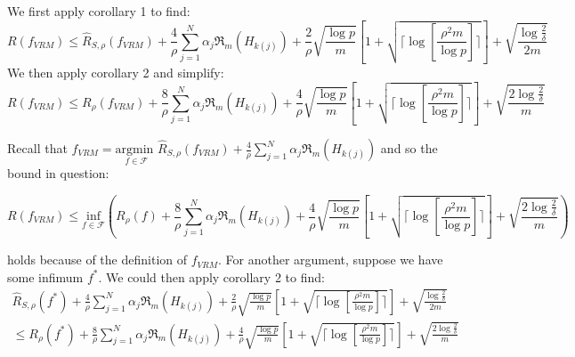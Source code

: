 \documentclass[]{article}
\title{}
\author{}
\begin{document}
\maketitle

\section{}

We first apply corollary 1 to find:
\begin{equation}
	R(f_{VRM}) \le \hat{R}_{S,\rho}\left(f_{VRM}\right) + \frac{4}{\rho} \sum_{j=1}^{N} \alpha_j \mathfrak{R}_m \left( H_{k \left( j \right)} \right) + \frac{2}{\rho} \sqrt{\frac{\log p}{m}} \left[1+\sqrt{\lceil \log \left[ \frac{\rho^2 m}{\log p} \right]\rceil}\right] + \sqrt{\frac{\log \frac{2}{\delta}}{2m}}
\end{equation}
We then apply corollary 2 and simplify:
\begin{equation}
	R(f_{VRM}) \le R_\rho\left(f_{VRM}\right) + \frac{8}{\rho} \sum_{j=1}^{N} \alpha_j \mathfrak{R}_m \left( H_{k \left( j \right)} \right) + \frac{4}{\rho} \sqrt{\frac{\log p}{m}} \left[1+\sqrt{\lceil \log \left[ \frac{\rho^2 m}{\log p} \right]\rceil}\right] + \sqrt{\frac{2\log \frac{2}{\delta}}{m}}
\end{equation}

\noindent Recall that $f_{VRM} = \underset{f \in \mathcal{F}}{\text{argmin }} \hat{R}_{S,\rho}\left(f_{VRM}\right) + \frac{4}{\rho} \sum_{j=1}^{N} \alpha_j \mathfrak{R}_m \left( H_{k \left( j \right)} \right)$ and so the bound in question:

\begin{equation}
	R(f_{VRM}) \le \underset{f \in \mathcal{F}}{\text{inf}}\left(R_\rho\left(f\right) + \frac{8}{\rho} \sum_{j=1}^{N} \alpha_j \mathfrak{R}_m \left( H_{k \left( j \right)} \right) + \frac{4}{\rho} \sqrt{\frac{\log p}{m}} \left[1+\sqrt{\lceil \log \left[ \frac{\rho^2 m}{\log p} \right]\rceil}\right] + \sqrt{\frac{2\log \frac{2}{\delta}}{m}}\right)
\end{equation}

\noindent holds because of the definition of $f_{VRM}$. For another argument, suppose we have some infimum $f^*$. We could then apply corollary 2 to find:
\begin{equation}
\begin{split}
	\hat{R}_{S,\rho}\left(f^*\right) + \frac{4}{\rho} \sum_{j=1}^{N} \alpha_j \mathfrak{R}_m \left( H_{k \left( j \right)} \right) + \frac{2}{\rho} \sqrt{\frac{\log p}{m}} \left[1+\sqrt{\lceil \log \left[ \frac{\rho^2 m}{\log p} \right]\rceil}\right] + \sqrt{\frac{\log \frac{2}{\delta}}{2m}} \\
	\le R_{\rho}\left(f^*\right) + \frac{8}{\rho} \sum_{j=1}^{N} \alpha_j \mathfrak{R}_m \left( H_{k \left( j \right)} \right) + \frac{4}{\rho} \sqrt{\frac{\log p}{m}} \left[1+\sqrt{\lceil \log \left[ \frac{\rho^2 m}{\log p} \right]\rceil}\right] + \sqrt{\frac{2\log \frac{2}{\delta}}{m}}
\end{split}
\end{equation}
\end{document}
